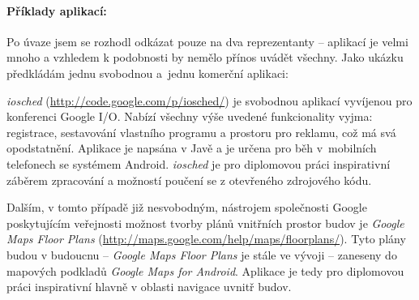 \paragraph{Příklady aplikací:}
Po úvaze jsem se rozhodl odkázat pouze na dva reprezentanty -- aplikací je velmi mnoho a vzhledem k podobnosti by nemělo přínos uvádět všechny. Jako ukázku předkládám jednu svobodnou a~jednu komerční aplikaci:

\emph{iosched} (\url{http://code.google.com/p/iosched/}) je svobodnou aplikací vyvíjenou pro konferenci Google I/O. Nabízí všechny výše uvedené funkcionality vyjma: registrace, sestavování vlastního programu a prostoru pro reklamu, což má svá opodstatnění. Aplikace je napsána v Javě a je určena pro běh v~mobilních telefonech se systémem Android. \emph{iosched} je pro diplomovou práci inspirativní záběrem zpracování a možností poučení se z otevřeného zdrojového kódu.

Dalším, v tomto případě již nesvobodným, nástrojem společnosti Google poskytujícím veřejnosti možnost tvorby plánů vnitřních prostor budov je \textit{Google Maps Floor Plans} (\url{http://maps.google.com/help/maps/floorplans/}). Tyto plány budou v budoucnu -- \emph{Google Maps Floor Plans} je stále ve vývoji -- zaneseny do mapových podkladů \emph{Google Maps for Android}. Aplikace je tedy pro diplomovou práci inspirativní hlavně v oblasti navigace uvnitř budov.
